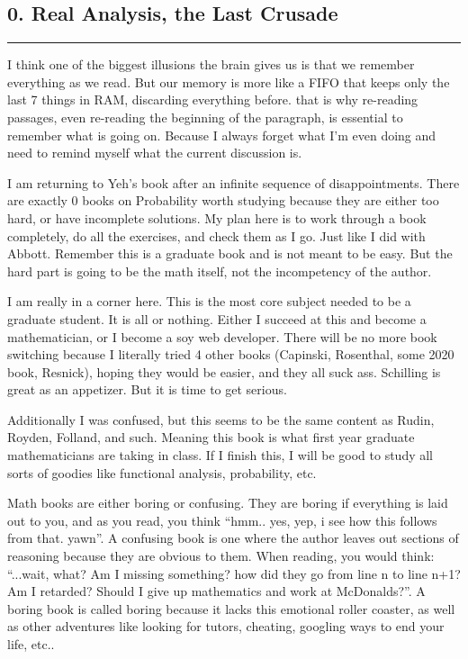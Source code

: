 \documentclass{article}
\begin{document}
\begin{flushleft}

\section*{0. Real Analysis, the Last Crusade}
\bigbreak
\hrule
\bigbreak

\qquad I think one of the biggest illusions the brain gives us is that we remember everything as we read. But our memory is more like a FIFO that keeps only the last 7 things in RAM, discarding everything before. that is why re-reading passages, even re-reading the beginning of the paragraph, is essential to remember what is going on. Because I always forget what I'm even doing and need to remind myself what the current discussion is.

\qquad I am returning to Yeh's book after an infinite sequence of disappointments. There are exactly 0 books on Probability worth studying because they are either too hard, or have incomplete solutions. My plan here is to work through a book completely, do all the exercises, and check them as I go. Just like I did with Abbott. Remember this is a graduate book and is not meant to be easy. But the hard part is going to be the math itself, not the incompetency of the author. 

\qquad I am really in a corner here. This is the most core subject needed to be a graduate student. It is all or nothing. Either I succeed at this and become a mathematician, or I become a soy web developer. There will be no more book switching because I literally tried 4 other books (Capinski, Rosenthal, some 2020 book, Resnick), hoping they would be easier, and they all suck ass. Schilling is great as an appetizer. But it is time to get serious. 

\qquad Additionally I was confused, but this seems to be the same content as Rudin, Royden, Folland, and such. Meaning this book is what first year graduate mathematicians are taking in class. If I finish this, I will be good to study all sorts of goodies like functional analysis, probability, etc. 

\qquad Math books are either boring or confusing. They are boring if everything is laid out to you, and as you read, you think ``hmm.. yes, yep, i see how this follows from that. yawn''. A confusing book is one where the author leaves out sections of reasoning because they are obvious to them. When reading, you would think: ``...wait, what? Am I missing something? how did they go from line n to line n+1? Am I retarded? Should I give up mathematics and work at McDonalds?''. A boring book is called boring because it lacks this emotional roller coaster, as well as other adventures like looking for tutors, cheating, googling ways to end your life, etc.. 


\end{flushleft}
\end{document}
